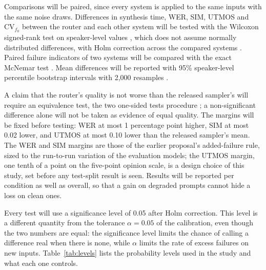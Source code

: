Comparisons will be paired, since every system is applied to the same inputs with the same noise draws. Differences in synthesis time, WER, SIM, UTMOS and $\mathrm{CV}_{f_0}$ between the router and each other system will be tested with the Wilcoxon signed-rank test on speaker-level values \parencite{wilcoxon1945}, which does not assume normally distributed differences, with Holm correction across the compared systems \parencite{holm1979}. Paired failure indicators of two systems will be compared with the exact McNemar test \parencite{mcnemar1947}. Mean differences will be reported with 95\% speaker-level percentile bootstrap intervals with 2,000 resamples .

A claim that the router's quality is not worse than the released sampler's will require an equivalence test, the two one-sided tests procedure \parencite{schuirmann1987}; a non-significant difference alone will not be taken as evidence of equal quality. The margins will be fixed before testing: WER at most 1 percentage point higher, SIM at most 0.02 lower, and UTMOS at most 0.10 lower than the released sampler's mean. The WER and SIM margins are those of the earlier proposal's added-failure rule, sized to the run-to-run variation of the evaluation models; the UTMOS margin, one tenth of a point on the five-point opinion scale, is a design choice of this study, set before any test-split result is seen. Results will be reported per condition as well as overall, so that a gain on degraded prompts cannot hide a loss on clean ones.

Every test will use a significance level of 0.05 after Holm correction. This level is a different quantity from the tolerance $\alpha=0.05$ of the calibration, even though the two numbers are equal: the significance level limits the chance of calling a difference real when there is none, while $\alpha$ limits the rate of excess failures on new inputs. Table~\ref{tab:levels} lists the probability levels used in the study and what each one controls.

